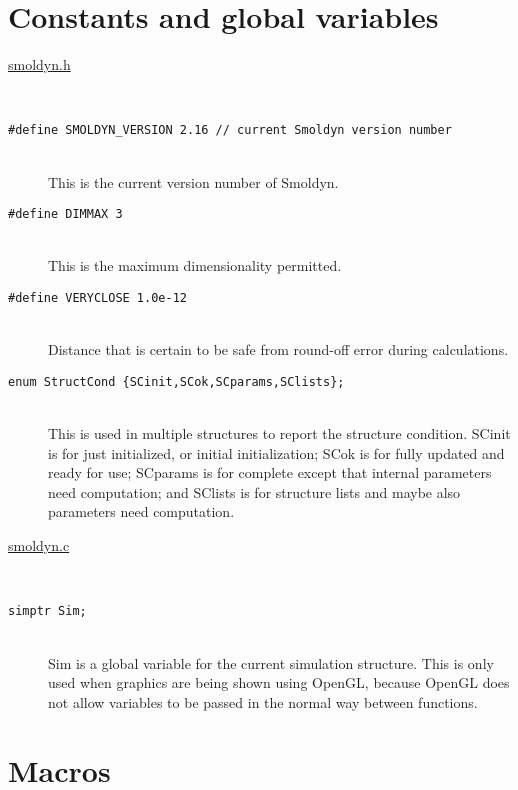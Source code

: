 \documentclass {scrbook}
\newcommand {\ttt} {\texttt}
\begin{document}
\section{Constants and global variables}


\begin{description}

\item[\underline{smoldyn.h}]
\hfill \\

\item[\ttt{\#define SMOLDYN\_VERSION 2.16 // current Smoldyn version number}]
\hfill \\
This is the current version number of Smoldyn.
	
\item[\ttt{\#define DIMMAX 3}]
\hfill \\
This is the maximum dimensionality permitted.

\item[\ttt{\#define VERYCLOSE 1.0e-12}]
\hfill \\
Distance that is certain to be safe from round-off error during calculations.

\item[\ttt{enum StructCond \{SCinit,SCok,SCparams,SClists\};}]
\hfill \\
This is used in multiple structures to report the structure condition. SCinit is for just initialized, or initial initialization; SCok is for fully updated and ready for use; SCparams is for complete except that internal parameters need computation; and SClists is for structure lists and maybe also parameters need computation.

\item[\underline{smoldyn.c}]
\hfill \\

\item[\ttt{simptr Sim;}]
\hfill \\
Sim is a global variable for the current simulation structure. This is only used when graphics are being shown using OpenGL, because OpenGL does not allow variables to be passed in the normal way between functions.

\end{description}

\section{Macros}
\end{document}
